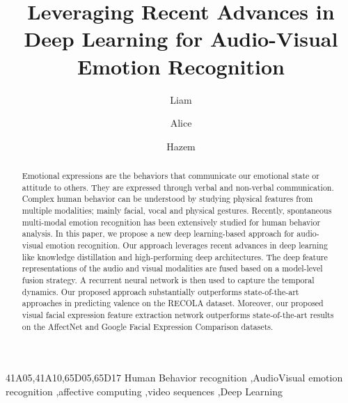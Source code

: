 \documentclass[times,twocolumn,final,authoryear]{elsarticle}
\begin{document}
	
	
	
	
	\ifpreprint
	\setcounter{page}{1}
	\else
	\setcounter{page}{1}
	\fi
	
	\begin{frontmatter}
		
		\title{Leveraging Recent Advances in Deep Learning for Audio-Visual Emotion Recognition}
		
		\author[1]{Liam } 
		\author[2]{Alice } 
		\author[1,2]{Hazem }
		
		
		
		
		\address[1]{Powder AI Research}
		\address[2]{Universit\'e Paris-Est, LISSI, UPEC, 94400 Vitry sur Seine, France}
		
		
		\begin{abstract}
			Emotional expressions are the behaviors that communicate our emotional state or attitude to others. They are expressed through verbal and non-verbal communication. Complex human behavior can be understood by studying physical features from multiple modalities; mainly facial, vocal and physical gestures. Recently, spontaneous multi-modal emotion recognition has been extensively studied for human behavior analysis. In this paper, we propose a new deep learning-based approach for audio-visual emotion recognition. Our approach leverages recent advances in deep learning like knowledge distillation and high-performing deep architectures. The deep feature representations of the audio and visual modalities are fused based on a model-level fusion strategy. A recurrent neural network is then used to capture the temporal dynamics. Our proposed approach substantially outperforms state-of-the-art approaches in predicting valence on the RECOLA dataset. Moreover, our proposed visual facial expression feature extraction network outperforms state-of-the-art results on the AffectNet and Google Facial Expression Comparison datasets.
		\end{abstract}
		
		\begin{keyword}
			\MSC 41A05\sep 41A10\sep 65D05\sep 65D17
			\KWD  Human Behavior recognition  \sep AudioVisual emotion recognition \sep affective computing \sep video sequences \sep Deep Learning
			
\end{keyword}
		
	\end{frontmatter}
	
\end{document}
